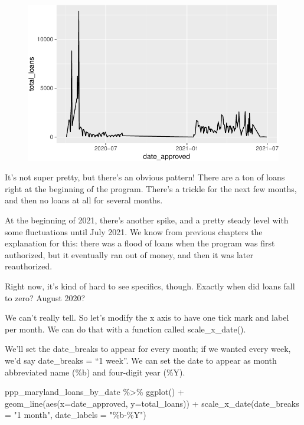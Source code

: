 \documentclass[
  letterpaper,
  DIV=11,
  numbers=noendperiod]{scrreprt}
\newenvironment{Shaded}{\begin{snugshade}}{\end{snugshade}}
\newcommand{\AttributeTok}[1]{\textcolor[rgb]{0.40,0.45,0.13}{#1}}
\newcommand{\FunctionTok}[1]{\textcolor[rgb]{0.28,0.35,0.67}{#1}}
\newcommand{\NormalTok}[1]{\textcolor[rgb]{0.00,0.23,0.31}{#1}}
\newcommand{\SpecialCharTok}[1]{\textcolor[rgb]{0.37,0.37,0.37}{#1}}
\newcommand{\StringTok}[1]{\textcolor[rgb]{0.13,0.47,0.30}{#1}}
\begin{document}
\begin{figure}[H]

{\centering \includegraphics{./visualizing-for-reporting_files/figure-pdf/unnamed-chunk-13-1.pdf}

}

\end{figure}

It's not super pretty, but there's an obvious pattern! There are a ton
of loans right at the beginning of the program. There's a trickle for
the next few months, and then no loans at all for several months.

At the beginning of 2021, there's another spike, and a pretty steady
level with some fluctuations until July 2021. We know from previous
chapters the explanation for this: there was a flood of loans when the
program was first authorized, but it eventually ran out of money, and
then it was later reauthorized.

Right now, it's kind of hard to see specifics, though. Exactly when did
loans fall to zero? August 2020?

We can't really tell. So let's modify the x axis to have one tick mark
and label per month. We can do that with a function called
scale\_x\_date().

We'll set the date\_breaks to appear for every month; if we wanted every
week, we'd say date\_breaks = ``1 week''. We can set the date to appear
as month abbreviated name (\%b) and four-digit year (\%Y).

\begin{Shaded}
\begin{Highlighting}[]
\NormalTok{ppp\_maryland\_loans\_by\_date }\SpecialCharTok{\%\textgreater{}\%}
  \FunctionTok{ggplot}\NormalTok{() }\SpecialCharTok{+}
  \FunctionTok{geom\_line}\NormalTok{(}\FunctionTok{aes}\NormalTok{(}\AttributeTok{x=}\NormalTok{date\_approved, }\AttributeTok{y=}\NormalTok{total\_loans)) }\SpecialCharTok{+}
  \FunctionTok{scale\_x\_date}\NormalTok{(}\AttributeTok{date\_breaks =} \StringTok{"1 month"}\NormalTok{, }\AttributeTok{date\_labels =} \StringTok{"\%b{-}\%Y"}\NormalTok{)}
\end{Highlighting}
\end{Shaded}
\end{document}
